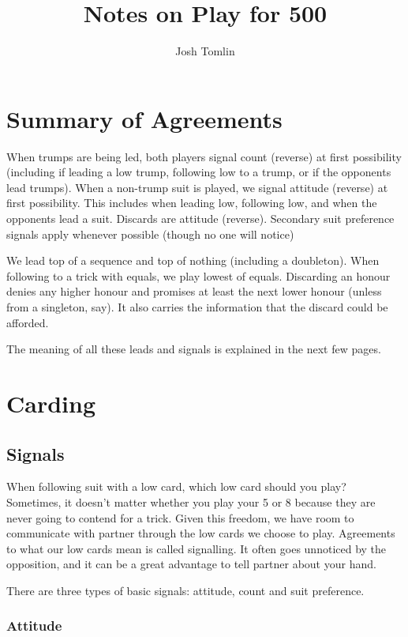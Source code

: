 \documentclass[a4paper]{JoshCards}
\title{Notes on Play for 500}
\author{Josh Tomlin}
\date{}
\begin{document}
\maketitle

\chapter*{Summary of Agreements}

When trumps are being led, both players signal count (reverse) at first possibility (including if leading a low trump, following low to a trump, or if the opponents lead trumps). When a non-trump suit is played, we signal attitude (reverse) at first possibility. This includes when leading low, following low, and when the opponents lead a suit. Discards are attitude (reverse). Secondary suit preference signals apply whenever possible (though no one will notice)

We lead top of a sequence and top of nothing (including a doubleton). When following to a trick with equals, we play lowest of equals. Discarding an honour denies any higher honour and promises at least the next lower honour (unless from a singleton, say). It also carries the information that the discard could be afforded.

The meaning of all these leads and signals is explained in the next few pages.

\chapter*{Carding}

\section*{Signals}

When following suit with a low card, which low card should you play? Sometimes, it doesn't matter whether you play your 5 or 8 because they are never going to contend for a trick. Given this freedom, we have room to communicate with partner through the low cards we choose to play. Agreements to what our low cards mean is called signalling. It often goes unnoticed by the opposition, and it can be a great advantage to tell partner about your hand.

There are three types of basic signals: attitude, count and suit preference.

\subsection*{Attitude}
\end{document}
